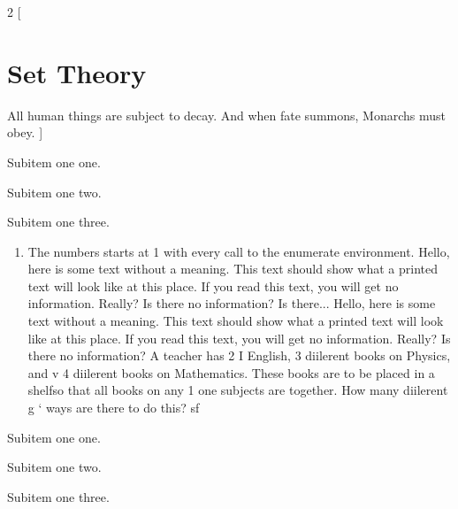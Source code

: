 \documentclass[14pt]{article}
\begin{document}
\begin{multicols}{2}
[
\section{Set Theory}
All human things are subject to decay. And when fate summons, Monarchs must obey.
]
\noindent
 \begin{inparaenum}[(1)]
     \item Subitem one one.
     \item Subitem one two.
     \item Subitem one three.
   \end{inparaenum}

\begin{enumerate}
  \item The numbers starts at 1 with every call to the enumerate environment.
Hello, here is some text without a meaning.  This text should show what 
a printed text will look like at this place.
If you read this text, you will get no information.  Really?  Is there 
no information?  Is there...
Hello, here is some text without a meaning.  This text should show what 
a printed text will look like at this place.
If you read this text, you will get no information.  Really?  Is there 
no information? A teacher has 2
I English, 3 diilerent books on Physics, and
v 4 diilerent books on Mathematics. These books
are to be placed in a shelfso that all books on any
1 one subjects are together. How many diilerent
g ‘ ways are there to do this? sf
\end{enumerate}
  \begin{inparaenum}[(1)]
     \item Subitem one one.
     \item Subitem one two.
     \item Subitem one three.
   \end{inparaenum}
\end{multicols}
 
\end{document}
